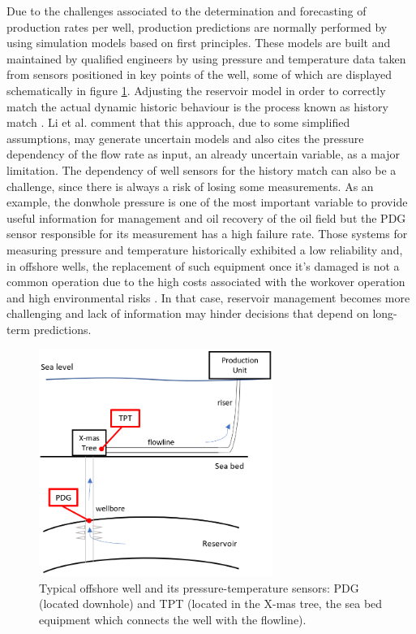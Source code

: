 \documentclass[conference]{IEEEtran}
\begin{document}
Due to the challenges associated to the determination and forecasting of production rates per 
well, production predictions are normally performed by using simulation models based on first 
principles. These models are built and maintained by qualified engineers by using pressure and 
temperature data taken from sensors positioned in key points of the well, some of which are 
displayed schematically in figure \ref{fig:pressureSensors}. Adjusting the reservoir model in 
order to correctly match the actual dynamic historic behaviour is the process known as history 
match \cite{alakeely2022simulating}. Li et al. \cite{Li2019} comment that this approach, due 
to some simplified assumptions, may generate uncertain models and also cites the pressure 
dependency of the flow rate as input, an already uncertain variable, as a major limitation. 
The dependency of well sensors for the history match can also be a 
challenge, since there is always a risk of losing some measurements. As an example, the 
donwhole pressure is one of the most important variable to provide useful information for 
management and oil recovery of the oil field \cite{camponogara2010automation} but the PDG 
sensor responsible for its measurement has a high failure rate. Those systems for measuring 
pressure and temperature historically exhibited a low reliability \cite{Gisbergen2001} and, 
in offshore wells, the replacement of such equipment once it's damaged is not a common 
operation due to the high costs associated with the workover operation and high environmental 
risks \cite{Freitas2021}. In that case, reservoir management becomes more challenging and lack 
of information may hinder decisions that depend on long-term predictions. 

\begin{figure}[htbp]
\centerline{\includegraphics[width=3.0in]{wellScheme.png}}
\caption{Typical offshore well and its pressure-temperature sensors: PDG (located downhole) and TPT (located in the X-mas tree, the sea bed equipment which connects the well with the flowline).}
\label{fig:pressureSensors}
\end{figure}
\end{document}
